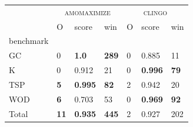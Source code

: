 \documentclass{article}
\begin{document}
            \begin{table}[t]
\label{tab:results}
\begin{tabular}{lllllll}
\toprule
 & \multicolumn{3}{c}{\textsc{{amomaximize}}} & \multicolumn{3}{c}{\textsc{{clingo}}} \\
 & O & score & win & O & score & win \\
benchmark &  &  &  &  &  &  \\
\midrule
GC & 0 & \textbf{1.0} & \textbf{289} & 0 & 0.885 & 11 \\
K & 0 & 0.912 & 21 & 0 & \textbf{0.996} & \textbf{79} \\
TSP & \textbf{5} & \textbf{0.995} & \textbf{82} & 2 & 0.942 & 20 \\
WOD & \textbf{6} & 0.703 & 53 & 0 & \textbf{0.969} & \textbf{92} \\
Total & \textbf{11} & \textbf{0.935} & \textbf{445} & 2 & 0.927 & 202 \\
\bottomrule
\end{tabular}
\end{table}

            
\end{document}
